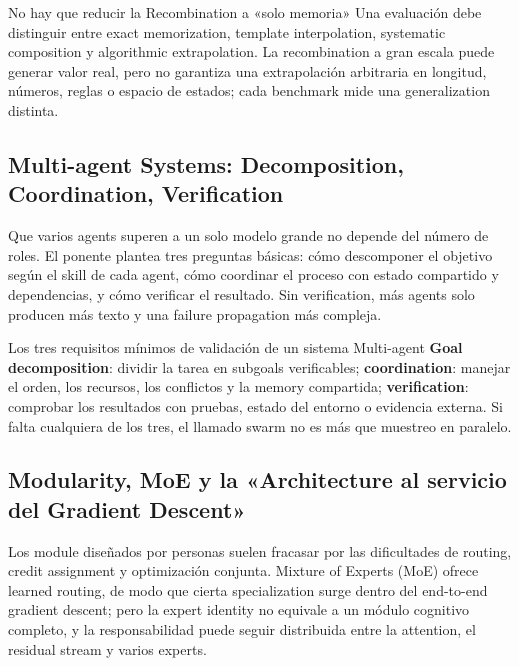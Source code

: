 \documentclass[a4paper]{article}
\begin{document}
\begin{knowledgebox}{No hay que reducir la Recombination a «solo memoria»}
Una evaluación debe distinguir entre exact memorization, template interpolation, systematic composition y algorithmic extrapolation. La recombination a gran escala puede generar valor real, pero no garantiza una extrapolación arbitraria en longitud, números, reglas o espacio de estados; cada benchmark mide una generalization distinta.
\end{knowledgebox}

\subsection{Multi-agent Systems: Decomposition, Coordination, Verification}

Que varios agents superen a un solo modelo grande no depende del número de roles. El ponente plantea tres preguntas básicas: cómo descomponer el objetivo según el skill de cada agent, cómo coordinar el proceso con estado compartido y dependencias, y cómo verificar el resultado. Sin verification, más agents solo producen más texto y una failure propagation más compleja.

\begin{importantbox}{Los tres requisitos mínimos de validación de un sistema Multi-agent}
\textbf{Goal decomposition}: dividir la tarea en subgoals verificables; \textbf{coordination}: manejar el orden, los recursos, los conflictos y la memory compartida; \textbf{verification}: comprobar los resultados con pruebas, estado del entorno o evidencia externa. Si falta cualquiera de los tres, el llamado swarm no es más que muestreo en paralelo.
\end{importantbox}


\subsection{Modularity, MoE y la «Architecture al servicio del Gradient Descent»}

Los module diseñados por personas suelen fracasar por las dificultades de routing, credit assignment y optimización conjunta. Mixture of Experts (MoE) ofrece learned routing, de modo que cierta specialization surge dentro del end-to-end gradient descent; pero la expert identity no equivale a un módulo cognitivo completo, y la responsabilidad puede seguir distribuida entre la attention, el residual stream y varios experts.
\end{document}
